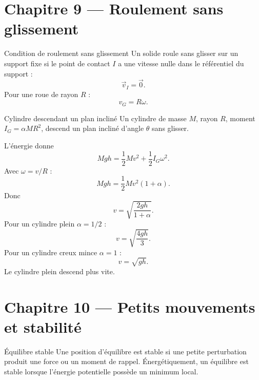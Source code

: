 \documentclass[11pt,a4paper]{article}
\begin{document}
\section{Chapitre 9 — Roulement sans glissement}

\begin{definitionbox}{Condition de roulement sans glissement}{}
Un solide roule sans glisser sur un support fixe si le point de contact $I$ a une vitesse nulle dans le référentiel du support :
\[
\vec v_I=\vec 0.
\]
Pour une roue de rayon $R$ :
\[
v_G=R\omega.
\]
\end{definitionbox}

\begin{center}
\end{center}

\begin{examplebox}{Cylindre descendant un plan incliné}{}
Un cylindre de masse $M$, rayon $R$, moment $I_G=\alpha MR^2$, descend un plan incliné d'angle $\theta$ sans glisser.

L'énergie donne
\[
Mg h=\frac12Mv^2+\frac12I_G\omega^2.
\]
Avec $\omega=v/R$ :
\[
Mg h=\frac12Mv^2(1+\alpha).
\]
Donc
\[
v=\sqrt{\frac{2gh}{1+\alpha}}.
\]
Pour un cylindre plein $\alpha=1/2$ :
\[
v=\sqrt{\frac{4gh}{3}}.
\]
Pour un cylindre creux mince $\alpha=1$ :
\[
v=\sqrt{gh}.
\]
Le cylindre plein descend plus vite.
\end{examplebox}

\section{Chapitre 10 — Petits mouvements et stabilité}

\begin{definitionbox}{Équilibre stable}{}
Une position d'équilibre est stable si une petite perturbation produit une force ou un moment de rappel.
Énergétiquement, un équilibre est stable lorsque l'énergie potentielle possède un minimum local.
\end{definitionbox}
\end{document}
